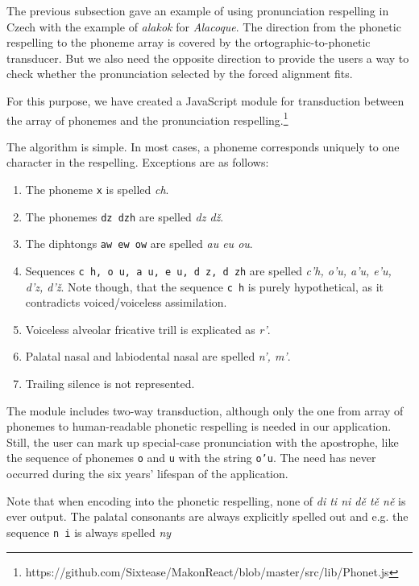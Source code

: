 \documentclass{itatnew}
\begin{document}
The previous subsection gave an example of using pronunciation respelling in
Czech with the example of {\em alakok} for {\em Alacoque}. The direction from
the phonetic respelling to the phoneme array is covered by the
ortographic-to-phonetic transducer. But we also need the opposite direction to
provide the users a way to check whether the pronunciation selected by the
forced alignment fits.

For this purpose, we have created a JavaScript module for transduction between
the array of phonemes and the pronunciation
respelling.\footnote{https://github.com/Sixtease/MakonReact/\allowbreak{}blob/master/src/lib/Phonet.js}

The algorithm is simple. In most cases, a phoneme corresponds uniquely to one
character in the respelling. Exceptions are as follows:
\begin{enumerate}
\item{The phoneme \texttt{x} is spelled {\em ch}.}
\item{The phonemes \texttt{dz dzh} are spelled {\em dz dž}.}
\item{The diphtongs \texttt{aw ew ow} are spelled {\em au eu ou}.}
\item{
    Sequences \texttt{c h, o u, a u, e u, d z, d zh} are
    spelled {\em c'h, o'u, a'u, e'u, d'z, d'ž}. Note
    though, that the sequence \texttt{c h} is purely hypothetical, as it
    contradicts voiced/voiceless assimilation.
}
\item{
    Voiceless alveolar fricative trill is explicated as {\em r'}.
}
\item{
    Palatal nasal and labiodental nasal are spelled {\em n', m'}.
}
\item{Trailing silence is not represented.}
\end{enumerate}

The module includes two-way transduction, although only the one from array of
phonemes to human-readable phonetic respelling is needed in our application.
Still, the user can mark up special-case pronunciation with the apostrophe, like
the sequence of phonemes \texttt{o} and \texttt{u} with the string \texttt{o'u}.
The need has never occurred during the six years' lifespan of the application.

Note that when encoding into the phonetic respelling, none of
{\em di ti ni dě tě ně} is ever output. The palatal consonants are always
explicitly spelled out and e.g. the sequence \texttt{n i} is always spelled
{\em ny}
\end{document}

